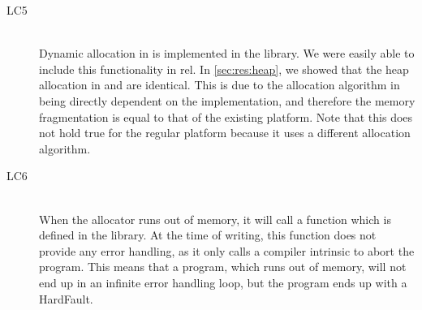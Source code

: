 \begin{description}
\item [LC5 {\lcv}] \hfill \\
  Dynamic allocation in {\rust} is implemented in the  library.
  We were easily able to include this functionality in \gls{rel}.
  In \autoref{sec:res:heap}, we showed that the heap allocation in {\rust} and {\C} are identical.
  This is due to the allocation algorithm in {\rust} being directly dependent on the   implementation, and therefore the memory fragmentation is equal to that of the existing {\C} platform.
  Note that this does not hold true for the regular {\rust} platform because it uses a different allocation algorithm.

\item [LC6 {\lcvi}] \hfill \\
  When the {\rust} allocator runs out of memory, it will call a function which is defined in the  library.
  At the time of writing, this function does not provide any error handling, as it only calls a compiler intrinsic to abort the program.
  This means that a {\rust} program, which runs out of memory, will not end up in an infinite error handling loop, but the program ends up with a HardFault.

\end{description}
